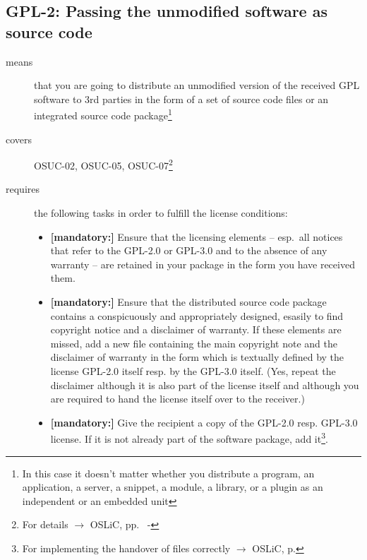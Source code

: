 \subsection{GPL-2: Passing the unmodified software as source code}
\label{OSUC-02-GPL} \label{OSUC-05-GPL} \label{OSUC-07-GPL} 

\begin{description}

\item[means] that you are going to distribute an unmodified version of the
received GPL software to 3rd parties in the form of a set of source code files
or an integrated source code package\footnote{In this case it doesn't matter
whether you  distribute a program, an application, a server, a snippet, a
module, a library, or a plugin as an independent or an embedded unit}

\item[covers] OSUC-02, OSUC-05, OSUC-07\footnote{For details $\rightarrow$
OSLiC, pp.\ \pageref{OSUC-02-DEF} - \pageref{OSUC-07-DEF}}

\item[requires] the following tasks in order to fulfill the license conditions:
\begin{itemize}
 
  \item \textbf{[mandatory:]} Ensure that the licensing elements -- esp.\ all
  notices that refer to the GPL-2.0 or GPL-3.0 and to the absence of any
  warranty -- are retained in your package in the form you have received them.

  \item \textbf{[mandatory:]} Ensure that the distributed source code package
  contains a conspicuously and appropriately designed, esasily to find copyright
  notice and a disclaimer of warranty. If these elements are missed, add a new
  file containing the main copyright note and the disclaimer of warranty in the
  form which is textually defined by the license GPL-2.0 itself resp. by the
  GPL-3.0 itself. (Yes, repeat the disclaimer although it is also part of the
  license itself and although you are required to hand the license itself over
  to the receiver.)
  
  \item \textbf{[mandatory:]} Give the recipient a copy of the GPL-2.0 resp.
  GPL-3.0 license. If it is not already part of the software package, add
  it\footnote{For implementing the handover of files correctly $\rightarrow$
  OSLiC, p. \pageref{DistributingFilesHint}}.


\end{itemize}
\end{description}
